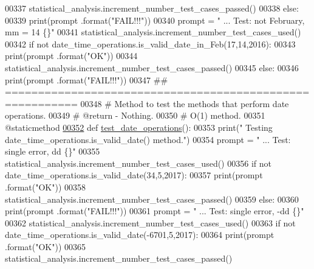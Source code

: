 \begin{DoxyCode}
00337             statistical\_analysis.increment\_number\_test\_cases\_passed()
00338         \textcolor{keywordflow}{else}:
00339             print(prompt .format(\textcolor{stringliteral}{"FAIL!!!"}))
00340         prompt = \textcolor{stringliteral}{"  ... Test: not February, mm = 14             \{\}"}
00341         statistical\_analysis.increment\_number\_test\_cases\_used()
00342         \textcolor{keywordflow}{if} \textcolor{keywordflow}{not} date\_time\_operations.is\_valid\_date\_in\_Feb(17,14,2016):
00343             print(prompt .format(\textcolor{stringliteral}{"OK"}))
00344             statistical\_analysis.increment\_number\_test\_cases\_passed()
00345         \textcolor{keywordflow}{else}:
00346             print(prompt .format(\textcolor{stringliteral}{"FAIL!!!"}))
00347     \textcolor{comment}{## =========================================================}
00348     \textcolor{comment}{#   Method to test the methods that perform date operations.}
00349     \textcolor{comment}{#   @return - Nothing.}
00350     \textcolor{comment}{#   O(1) method.}
00351     @staticmethod
\hypertarget{date__time__processing__tester_8py_source_l00352}{}\hyperlink{classutilities_1_1date__time__processing__tester_1_1date__time__operations__tester_a02e06fd6efcdf83ecedfe2b06eb6c965}{00352}     \textcolor{keyword}{def }\hyperlink{classutilities_1_1date__time__processing__tester_1_1date__time__operations__tester_a02e06fd6efcdf83ecedfe2b06eb6c965}{test\_date\_operations}():
00353         print(\textcolor{stringliteral}{" Testing date\_time\_operations.is\_valid\_date() method."})
00354         prompt = \textcolor{stringliteral}{"  ... Test: single error, dd              \{\}"}
00355         statistical\_analysis.increment\_number\_test\_cases\_used()
00356         \textcolor{keywordflow}{if} \textcolor{keywordflow}{not} date\_time\_operations.is\_valid\_date(34,5,2017):
00357             print(prompt .format(\textcolor{stringliteral}{"OK"}))
00358             statistical\_analysis.increment\_number\_test\_cases\_passed()
00359         \textcolor{keywordflow}{else}:
00360             print(prompt .format(\textcolor{stringliteral}{"FAIL!!!"}))
00361         prompt = \textcolor{stringliteral}{"  ... Test: single error, -dd             \{\}"}
00362         statistical\_analysis.increment\_number\_test\_cases\_used()
00363         \textcolor{keywordflow}{if} \textcolor{keywordflow}{not} date\_time\_operations.is\_valid\_date(-6701,5,2017):
00364             print(prompt .format(\textcolor{stringliteral}{"OK"}))
00365             statistical\_analysis.increment\_number\_test\_cases\_passed()

\end{DoxyCode}
